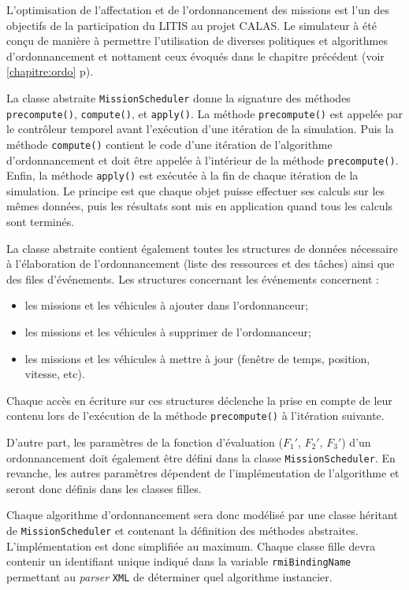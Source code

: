 L'optimisation de l'affectation et de l'ordonnancement des missions est l'un des objectifs de la participation du LITIS au projet CALAS. Le simulateur à été conçu de manière à permettre l'utilisation de diverses politiques et algorithmes d'ordonnancement et nottament ceux évoqués dans le chapitre précédent (voir \ref{chapitre:ordo} p\pageref{chapitre:ordo}).

La classe abstraite \verb!MissionScheduler! donne la signature des méthodes \verb!precompute()!, \verb!compute()!, et \verb!apply()!. La méthode \verb!precompute()! est appelée par le contrôleur temporel avant l'exécution  d'une itération de la simulation. Puis la méthode \verb!compute()! contient le code d'une itération de l'algorithme d'ordonnancement et doit être appelée à l'intérieur de la méthode \verb!precompute()!. Enfin, la méthode \verb!apply()! est exécutée à la fin de chaque itération de la simulation.
Le principe est que chaque objet puisse effectuer ses calculs sur les mêmes données, puis les résultats sont mis en application quand tous les calculs sont terminés.

La classe abstraite contient également toutes les structures de données nécessaire à l'élaboration de l'ordonnancement (liste des ressources et des tâches) ainsi que des files d'événements.
Les structures concernant les événements concernent : 
\begin{itemize}
 \item les missions et les véhicules à ajouter dans l'ordonnanceur;
 \item les missions et les véhicules à supprimer de l'ordonnanceur;
 \item les missions et les véhicules à mettre à jour (fenêtre de temps, position, vitesse, etc).
\end{itemize}

Chaque accès en écriture sur ces structures déclenche la prise en compte de leur contenu lors de l'exécution de la méthode \verb!precompute()! à l'itération suivante.

D'autre part, les paramètres de la fonction d'évaluation ($F_1'$, $F_2'$, $F_3'$) d'un ordonnancement doit également être défini dans la classe \verb!MissionScheduler!. En revanche, les autres paramètres dépendent de l'implémentation de l'algorithme et seront donc définis dans les classes filles.

Chaque algorithme d'ordonnancement sera donc modélisé par une classe héritant de \newline\verb!MissionScheduler! et contenant la définition des méthodes abstraites. L'implémentation est donc simplifiée au maximum.
Chaque classe fille devra contenir un identifiant unique indiqué dans la variable \verb!rmiBindingName! permettant au \textit{parser} \verb!XML! de déterminer quel algorithme instancier.

